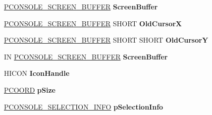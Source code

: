 \begin{DoxyCompactItemize}
\item 
\mbox{\label{struct___f_r_o_n_t_e_n_d___v_t_b_l_a10263ef7b3e211635e8d2945e3409963}} 
\hyperlink{struct___c_o_n_s_o_l_e___s_c_r_e_e_n___b_u_f_f_e_r}{P\+C\+O\+N\+S\+O\+L\+E\+\_\+\+S\+C\+R\+E\+E\+N\+\_\+\+B\+U\+F\+F\+ER} {\bfseries Screen\+Buffer}
\item 
\mbox{\label{struct___f_r_o_n_t_e_n_d___v_t_b_l_a0fbad73ea6ff6cefe67d9642a6854d75}} 
\hyperlink{struct___c_o_n_s_o_l_e___s_c_r_e_e_n___b_u_f_f_e_r}{P\+C\+O\+N\+S\+O\+L\+E\+\_\+\+S\+C\+R\+E\+E\+N\+\_\+\+B\+U\+F\+F\+ER} S\+H\+O\+RT {\bfseries Old\+CursorX}
\item 
\mbox{\label{struct___f_r_o_n_t_e_n_d___v_t_b_l_a32890b6b3914ded2fd6f8fe9a18f475b}} 
\hyperlink{struct___c_o_n_s_o_l_e___s_c_r_e_e_n___b_u_f_f_e_r}{P\+C\+O\+N\+S\+O\+L\+E\+\_\+\+S\+C\+R\+E\+E\+N\+\_\+\+B\+U\+F\+F\+ER} S\+H\+O\+RT S\+H\+O\+RT {\bfseries Old\+CursorY}
\item 
\mbox{\label{struct___f_r_o_n_t_e_n_d___v_t_b_l_aa5d31e4ebf21fb97fd024f70808f9b2e}} 
IN \hyperlink{struct___c_o_n_s_o_l_e___s_c_r_e_e_n___b_u_f_f_e_r}{P\+C\+O\+N\+S\+O\+L\+E\+\_\+\+S\+C\+R\+E\+E\+N\+\_\+\+B\+U\+F\+F\+ER} {\bfseries Screen\+Buffer}
\item 
\mbox{\label{struct___f_r_o_n_t_e_n_d___v_t_b_l_a4b07869aed834cfc42e38d429a53aa00}} 
H\+I\+C\+ON {\bfseries Icon\+Handle}
\item 
\mbox{\label{struct___f_r_o_n_t_e_n_d___v_t_b_l_a861a54f34c07db20e0422af84edc5a56}} 
\hyperlink{struct___c_o_o_r_d}{P\+C\+O\+O\+RD} {\bfseries p\+Size}
\item 
\mbox{\label{struct___f_r_o_n_t_e_n_d___v_t_b_l_af95b6c493ccc0324f2052aa53e88067e}} 
\hyperlink{struct___c_o_n_s_o_l_e___s_e_l_e_c_t_i_o_n___i_n_f_o}{P\+C\+O\+N\+S\+O\+L\+E\+\_\+\+S\+E\+L\+E\+C\+T\+I\+O\+N\+\_\+\+I\+N\+FO} {\bfseries p\+Selection\+Info}
\item 
\mbox{\label{struct___f_r_o_n_t_e_n_d___v_t_b_l_a8727fb94b944327da4419669888fe4bd}} 

\end{DoxyCompactItemize}
